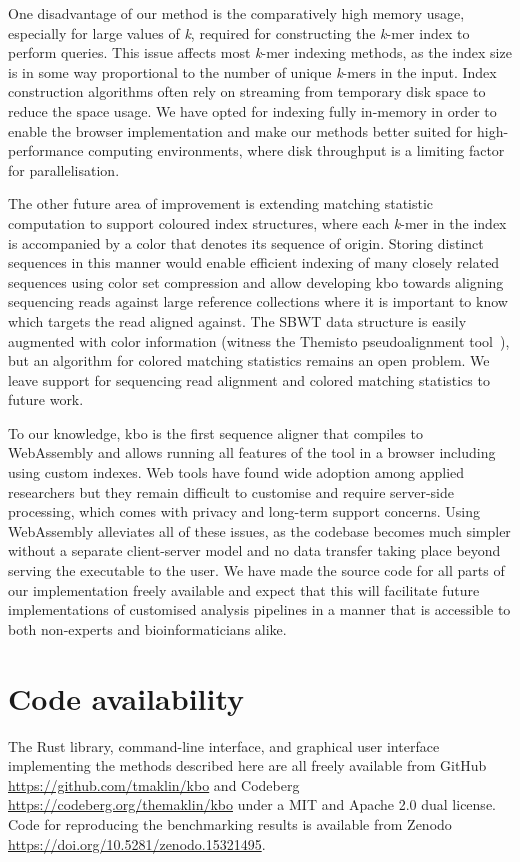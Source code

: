 \documentclass[unnumsec,webpdf,modern,large]{biorxiv}%
\theoremstyle{thmstyleone}%
\theoremstyle{thmstyletwo}%
\theoremstyle{thmstylethree}%
\begin{document}
One disadvantage of our method is the comparatively high memory usage, especially for large values of \emph{k}, required for constructing the \emph{k}-mer index to perform queries. This issue affects most \emph{k}-mer indexing methods, as the index size is in some way proportional to the number of unique \emph{k}-mers in the input. Index construction algorithms often rely on streaming from temporary disk space to reduce the space usage. We have opted for indexing fully in-memory in order to enable the browser implementation and make our methods better suited for high-performance computing environments, where disk throughput is a limiting factor for parallelisation.

The other future area of improvement is extending matching statistic computation to support coloured index structures, where each \emph{k}-mer in the index is accompanied by a color that denotes its sequence of origin. Storing distinct sequences in this manner would enable efficient indexing of many closely related sequences using color set compression and allow developing {\sf kbo} towards aligning sequencing reads against large reference collections where it is important to know which targets the read aligned against. The SBWT data structure is easily augmented with color information (witness the Themisto pseudoalignment tool~\cite{alanko2023themisto}), but an algorithm for colored matching statistics remains an open problem. We leave support for sequencing read alignment and colored matching statistics to future work.

To our knowledge, {\sf kbo} is the first sequence aligner that compiles to WebAssembly and allows running all features of the tool in a browser including using custom indexes. Web tools have found wide adoption among applied researchers but they remain difficult to customise and require server-side processing, which comes with privacy and long-term support concerns. Using WebAssembly alleviates all of these issues, as the codebase becomes much simpler without a separate client-server model and no data transfer taking place beyond serving the executable to the user. We have made the source code for all parts of our implementation freely available and expect that this will facilitate future implementations of customised analysis pipelines in a manner that is accessible to both non-experts and bioinformaticians alike.


\section{Code availability}
The Rust library, command-line interface, and graphical user interface implementing the methods described here are all freely available from GitHub \url{https://github.com/tmaklin/kbo} and Codeberg \url{https://codeberg.org/themaklin/kbo} under a MIT and Apache 2.0 dual license. Code for reproducing the benchmarking results is available from Zenodo \url{https://doi.org/10.5281/zenodo.15321495}.
\end{document}
